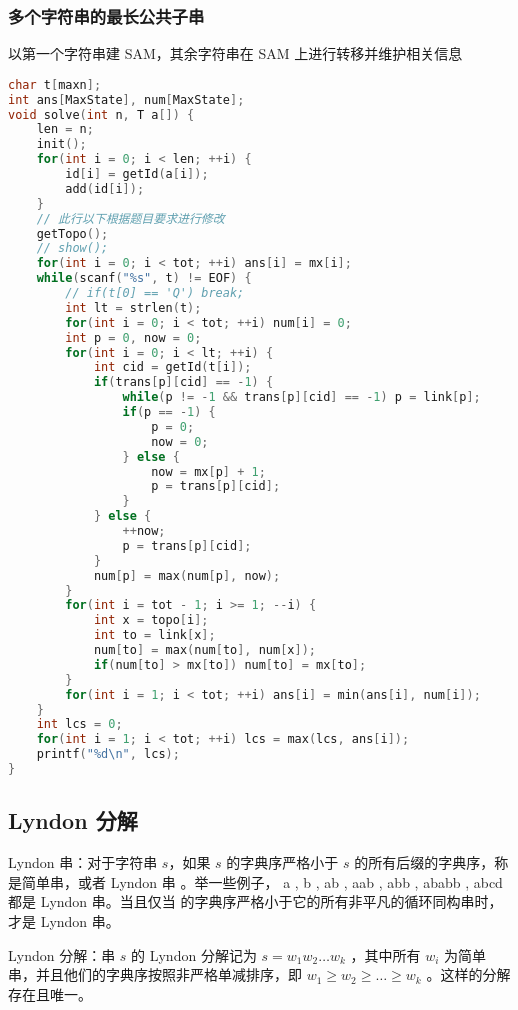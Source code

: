 \subsubsection{多个字符串的最长公共子串}

以第一个字符串建 SAM，其余字符串在 SAM 上进行转移并维护相关信息

\begin{lstlisting}[language=C++]
char t[maxn];
int ans[MaxState], num[MaxState];
void solve(int n, T a[]) {
    len = n;
    init();
    for(int i = 0; i < len; ++i) {
        id[i] = getId(a[i]);
        add(id[i]);
    }
    // 此行以下根据题目要求进行修改
    getTopo();
    // show();
    for(int i = 0; i < tot; ++i) ans[i] = mx[i];
    while(scanf("%s", t) != EOF) {
        // if(t[0] == 'Q') break;
        int lt = strlen(t);
        for(int i = 0; i < tot; ++i) num[i] = 0;
        int p = 0, now = 0;
        for(int i = 0; i < lt; ++i) {
            int cid = getId(t[i]);
            if(trans[p][cid] == -1) {
                while(p != -1 && trans[p][cid] == -1) p = link[p];
                if(p == -1) {
                    p = 0;
                    now = 0;
                } else {
                    now = mx[p] + 1;
                    p = trans[p][cid];
                }
            } else {
                ++now;
                p = trans[p][cid];
            }
            num[p] = max(num[p], now);
        }
        for(int i = tot - 1; i >= 1; --i) {
            int x = topo[i];
            int to = link[x];
            num[to] = max(num[to], num[x]);
            if(num[to] > mx[to]) num[to] = mx[to];
        }
        for(int i = 1; i < tot; ++i) ans[i] = min(ans[i], num[i]);
    }
    int lcs = 0;
    for(int i = 1; i < tot; ++i) lcs = max(lcs, ans[i]);
    printf("%d\n", lcs);
}    
\end{lstlisting}

\subsection{Lyndon 分解}

Lyndon 串：对于字符串 $s$，如果 $s$ 的字典序严格小于 $s$ 的所有后缀的字典序，称  是简单串，或者 Lyndon 串 。举一些例子， a , b , ab , aab , abb , ababb , abcd 都是 Lyndon 串。当且仅当  的字典序严格小于它的所有非平凡的循环同构串时，  才是 Lyndon 串。

Lyndon 分解：串 $s$ 的 Lyndon 分解记为 $s = w_1 w_2 \dots w_k$ ，其中所有 $w_i$ 为简单串，并且他们的字典序按照非严格单减排序，即 $w_1 \ge w_2 \ge \dots \ge w_k$ 。这样的分解存在且唯一。

